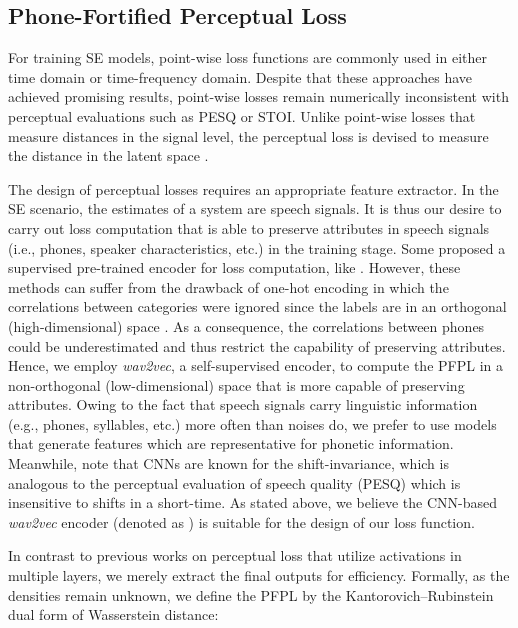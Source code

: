 \documentclass[a4paper]{article}
\begin{document}
\subsection{Phone-Fortified Perceptual Loss}
\label{ssec:problem_definition}


For training SE models, point-wise loss functions are commonly used in either time domain or time-frequency domain. Despite that these approaches have achieved promising results, point-wise losses remain numerically inconsistent with perceptual evaluations such as PESQ or STOI. Unlike point-wise losses that measure distances in the signal level, the perceptual loss is devised to measure the distance in the latent space \cite{johnson2016perceptual}. \par
The design of perceptual losses requires an appropriate feature extractor. In the SE scenario, the estimates of a system are speech signals. It is thus our desire to carry out loss computation that is able to preserve attributes in speech signals (i.e., phones, speaker characteristics, etc.) in the training stage. Some proposed a supervised pre-trained encoder for loss computation, like \cite{germain2019speech}. However, these methods can suffer from the drawback of one-hot encoding in which the correlations between categories were ignored since the labels are in an orthogonal (high-dimensional) space \cite{rodriguez2018beyond}. As a consequence, the correlations between phones could be underestimated and thus restrict the capability of preserving attributes. Hence, we employ {\it wav2vec}, a self-supervised encoder, to compute the PFPL in a non-orthogonal (low-dimensional) space that is more capable of preserving attributes. Owing to the fact that speech signals carry linguistic information (e.g., phones, syllables, etc.) more often than noises do, we prefer to use models that generate features which are representative for phonetic information. Meanwhile, note that CNNs are known for the shift-invariance, which is analogous to the perceptual evaluation of speech quality (PESQ) \cite{PESQ} which is insensitive to shifts in a short-time. As stated above, we believe the CNN-based \textit{wav2vec} encoder (denoted as ) is suitable for the design of our loss function. \par
In contrast to previous works on perceptual loss that utilize activations in multiple layers, we merely extract the final outputs for efficiency. Formally, as the densities remain unknown, we define the PFPL by the Kantorovich--Rubinstein \cite{optimaltransport} dual form of Wasserstein distance:
\end{document}
